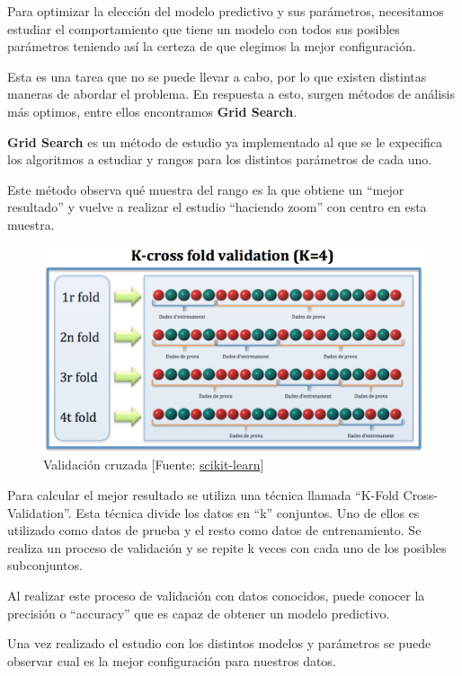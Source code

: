 	Para optimizar la elección del modelo predictivo y sus parámetros, necesitamos estudiar el comportamiento que tiene un modelo con todos sus posibles parámetros teniendo así la certeza de que elegimos la mejor configuración.

	Esta es una tarea que no se puede llevar a cabo, por lo que existen distintas maneras de abordar el problema. En respuesta a esto, surgen métodos de análisis más optimos, entre ellos encontramos \textbf{Grid Search}.

	\textbf{Grid Search} es un método de estudio ya implementado al que se le expecifica los algoritmos a estudiar y rangos para los distintos parámetros de cada uno. 

	Este método observa qué muestra del rango es la que obtiene un ``mejor resultado'' y vuelve a realizar el estudio ``haciendo zoom'' con centro en esta muestra.

	\begin{figure}[htb]
		\begin{center}
			\includegraphics[width=4.5in]{figures/Cross-Validation.jpg}
			\caption{Validación cruzada [Fuente: \href{www.scikit-learn.org}{scikit-learn}]}
		\end{center}
		\label{cross}
	\end{figure}

	Para calcular el mejor resultado se utiliza una técnica llamada ``K-Fold Cross-Validation''. Esta técnica divide los datos en ``k'' conjuntos. Uno de ellos es utilizado como datos de prueba y el resto como datos de entrenamiento. Se realiza un proceso de validación y se repite k veces con cada uno de los posibles subconjuntos.

	Al realizar este proceso de validación con datos conocidos, puede conocer la precisión o ``accuracy'' que es capaz de obtener un modelo predictivo.

	Una vez realizado el estudio con los distintos modelos y parámetros se puede observar cual es la mejor configuración para nuestros datos.
	
